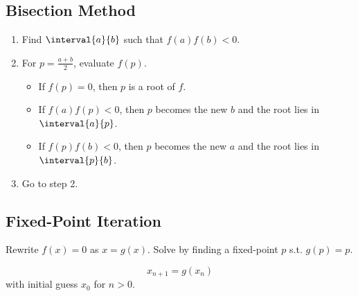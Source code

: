 \documentclass{article}
\begin{document}
\begin{multicols}{3}
    \subsection{Bisection Method}
    \begin{enumerate}
        \item Find \(\interval{a}{b}\) such that \(f\left( a \right) f\left( b \right) < 0\).
        \item For \(p = \tfrac{a+b}{2}\), evaluate \(f\left( p \right)\).
              \begin{itemize}
                  \item If \(f\left( p \right) = 0\), then \(p\) is a root of \(f\).
                  \item If \(f\left( a \right) f\left( p \right) < 0\), then \(p\) becomes the new \(b\) and the root lies in \(\interval{a}{p}\).
                  \item If \(f\left( p \right) f\left( b \right) < 0\), then \(p\) becomes the new \(a\) and the root lies in \(\interval{p}{b}\).
              \end{itemize}
        \item Go to step 2.
    \end{enumerate}
    \subsection{Fixed-Point Iteration}
    Rewrite \(f\left( x \right) = 0\) as \(x = g\left( x \right)\). Solve by finding a fixed-point
    \(p\) s.t. \(g\left( p \right) = p\).

    \begin{equation*}
        x_{n + 1} = g\left( x_n \right)
    \end{equation*}
    with initial guess \(x_0\) for \(n > 0\).
\end{multicols}
\end{document}
